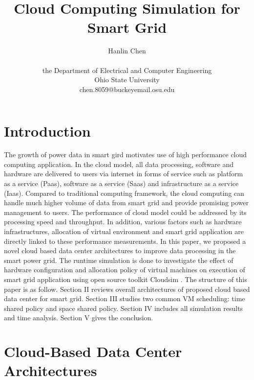 \documentclass[12pt]{article}
\begin{document}
\title{\textbf{Cloud Computing Simulation for Smart Grid}}
\author{Hanlin Chen\\\\the Department of Electrical and Computer Engineering\\Ohio State University\\ chen.8059@buckeyemail.osu.edu}
\maketitle 

\section{Introduction}
The growth of power  data in smart gird motivates use of high performance cloud computing  application. In the cloud model, all data processing, software and hardware are delivered to users via internet in forms of service such as platform as a service (Paas), software as a service (Saas) and infrastructure as a service (Iaas). Compared to traditional computing framework, the cloud computing can handle much higher volume of data from smart grid and provide promising power management to users. The performance of cloud model could be addressed by its processing speed and throughput. In addition, various factors such as hardware infrastructures, allocation of virtual environment and smart grid application are directly linked to these performance measurements. In this paper, we proposed a novel cloud based data center architectures to improve data processing in the smart power grid. 
The runtime simulation is done to investigate the effect of hardware configuration and allocation policy of virtual machines on execution of smart grid application using open source toolkit Cloudsim \cite{ok}. The structure of this paper is as follow. Section II reviews overall architectures of proposed cloud based data center for smart grid. Section III studies two common VM scheduling: time shared policy and space shared policy. Section IV includes all simulation results and time analysis. Section V gives the conclusion. 

\section{Cloud-Based Data Center Architectures}
\end{document}
